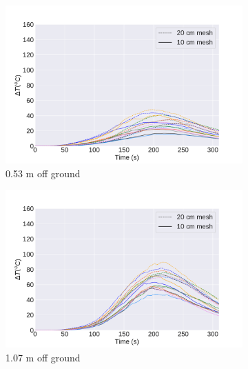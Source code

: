 \documentclass{article}
\begin{document}
\begin{figure}[htbp]
  \centering
  \begin{subfigure}[t]{.45\textwidth}
      \centering
      \includegraphics[width=\textwidth,keepaspectratio]{figures/053mesh_sensitivity.pdf}
      \caption{0.53 m off ground}
      \label{fig:0.53mesh_sensitivity}
  \end{subfigure}
  \begin{subfigure}[t]{.45\textwidth}
      \centering
      \includegraphics[width=\textwidth ,keepaspectratio]{figures/107mesh_sensitivity.pdf}
      \caption{1.07 m off ground}
      \label{fig:1.07mesh_sensitivity}
  \end{subfigure}
   \begin{subfigure}[t]{.45\textwidth}
      \centering

\end{subfigure}
\end{figure}
\end{document}
